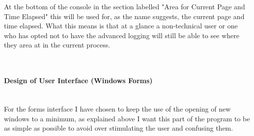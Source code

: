 \begin{FlushLeft}
    At the bottom of the console in the section labelled "Area for Current Page and Time Elapsed" this will be used for, as the name suggests, the current page and time elapsed. What this means is that at a glance a non-technical user or one who has opted not to have the advanced logging will still be able to see where they area at in the current process. \\ \bk

    \begin{figure}[H]
        \centering
    \end{figure}\\
    
    \BK

    \paragraph{Design of User Interface (Windows Forms)} \mbox{} \\
    For the forms interface I have chosen to keep the use of the opening of new windows to a minimum, as explained above I want this part of the program to be as simple as possible to avoid over stimulating the user and confusing them. 

    \begin{figure}[H]
        \centering
    \end{figure}\\


\end{FlushLeft}
